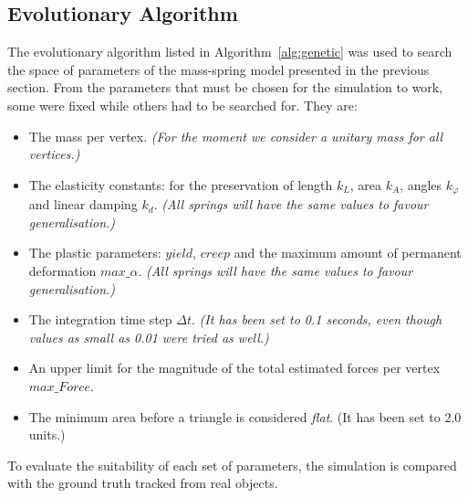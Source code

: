 \documentclass[journal]{IEEEtran}
\newcommand{\alref}[1]{Algorithm~\ref{#1}}
\newcounter{algorithm}
\begin{document}
\subsection{Evolutionary Algorithm}
The evolutionary algorithm listed in \alref{alg:genetic} was used to search the space of parameters of the mass-spring model presented in the previous section.
From the parameters that must be chosen for the simulation to work, some were fixed while others had to be searched for.  They are:
\begin{itemize}
 \item The mass per vertex.  \textit{(For the moment we consider a unitary mass for all vertices.)}
 \item The elasticity constants: for the preservation of length $k_L$, area $k_A$, angles $k_{\varphi}$ and linear damping $k_d$.  \textit{(All springs will have the same values to favour generalisation.)}
 \item The plastic parameters: $yield$, $creep$ and the maximum amount of permanent deformation $max\_\alpha$.  \textit{(All springs will have the same values to favour generalisation.)}
 \item The integration time step $\Delta t$.  \textit{(It has been set to 0.1 seconds, even though values as small as 0.01 were tried as well.)}
 \item An upper limit for the magnitude of the total estimated forces per vertex $max\_Force$.
 \item The minimum area before a triangle is considered \textit{flat}.  (It has been set to $2.0$ units.)
\end{itemize}
To evaluate the suitability of each set of parameters, the simulation is compared with the ground truth tracked from real objects.
\end{document}

